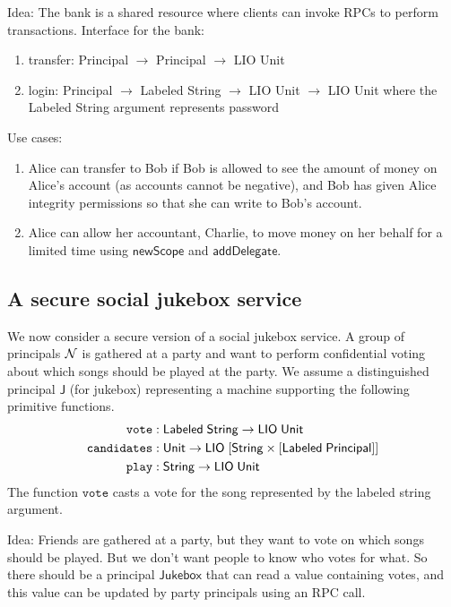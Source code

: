 \documentclass[conference]{IEEEtran}
\begin{document}
Idea: The bank is a shared resource where clients can invoke RPCs to perform transactions.
Interface for the bank:
\begin{enumerate}
    \item \textsf{transfer: Principal $\rightarrow$ Principal $\rightarrow$ LIO Unit}
    \item \textsf{login: Principal $\rightarrow$ Labeled String $\rightarrow$ LIO Unit $\rightarrow$ LIO Unit} where the Labeled String argument represents password
\end{enumerate}
Use cases:
\begin{enumerate}
    \item Alice can transfer to Bob if Bob is allowed to see the amount of money on Alice's account (as accounts cannot be negative), and Bob has given Alice integrity permissions so that she can write to Bob's account. 
    \item Alice can allow her accountant, Charlie, to move money on her behalf for a limited time using $\mathsf{newScope}$ and $\mathsf{addDelegate}$.
\end{enumerate}

\subsection{A secure social jukebox service}
We now consider a secure version of a social jukebox service. A group of principals $\mathcal{N}$ is gathered at a party and want to perform confidential voting about which songs should be played at the party. We assume a distinguished principal $\mathsf{J}$ (for jukebox) representing a machine supporting the following primitive functions.
\begin{align*}
\mathtt{vote}&: \mathsf{Labeled}\;\mathsf{String} \rightarrow \mathsf{LIO}\;\mathsf{Unit}\\
\mathtt{candidates}&: \mathsf{Unit} \rightarrow \mathsf{LIO}\;\lbrack\mathsf{String} \times \lbrack\mathsf{Labeled}\;\mathsf{Principal}\rbrack\rbrack\\
\mathtt{play}&: \mathsf{String} \rightarrow \mathsf{LIO}\;\mathsf{Unit}
\end{align*}
The function $\mathtt{vote}$ casts a vote for the song represented by the labeled string argument.


Idea: Friends are gathered at a party, but they want to vote on which songs should be played. But we don't want people to know who votes for what. So there should be a principal $\mathsf{Jukebox}$ that can read a value containing votes, and this value can be updated by party principals using an RPC call.
\end{document}
